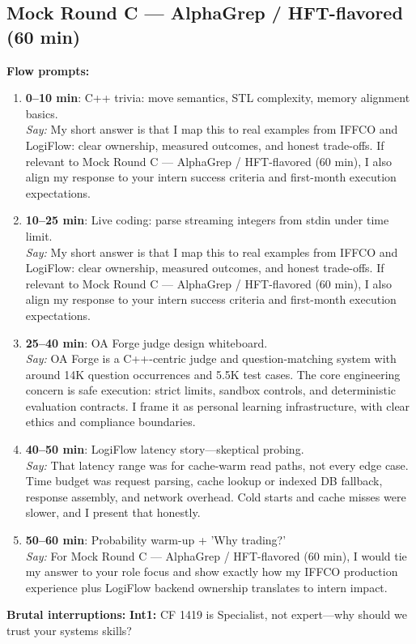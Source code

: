 \documentclass[9pt,a4paper]{article}
\begin{document}
\subsection{Mock Round C --- AlphaGrep / HFT-flavored (60 min)}
\textbf{Flow prompts:}
\begin{enumerate}
  \item \textbf{0--10 min}: C++ trivia: move semantics, STL complexity, memory alignment basics.\\
  \textit{Say:} My short answer is that I map this to real examples from IFFCO and LogiFlow: clear ownership, measured outcomes, and honest trade-offs. If relevant to Mock Round C --- AlphaGrep / HFT-flavored (60 min), I also align my response to your intern success criteria and first-month execution expectations.
  \item \textbf{10--25 min}: Live coding: parse streaming integers from stdin under time limit.\\
  \textit{Say:} My short answer is that I map this to real examples from IFFCO and LogiFlow: clear ownership, measured outcomes, and honest trade-offs. If relevant to Mock Round C --- AlphaGrep / HFT-flavored (60 min), I also align my response to your intern success criteria and first-month execution expectations.
  \item \textbf{25--40 min}: OA Forge judge design whiteboard.\\
  \textit{Say:} OA Forge is a C++-centric judge and question-matching system with around 14K question occurrences and 5.5K test cases. The core engineering concern is safe execution: strict limits, sandbox controls, and deterministic evaluation contracts. I frame it as personal learning infrastructure, with clear ethics and compliance boundaries.
  \item \textbf{40--50 min}: LogiFlow latency story---skeptical probing.\\
  \textit{Say:} That latency range was for cache-warm read paths, not every edge case. Time budget was request parsing, cache lookup or indexed DB fallback, response assembly, and network overhead. Cold starts and cache misses were slower, and I present that honestly.
  \item \textbf{50--60 min}: Probability warm-up + 'Why trading?'\\
  \textit{Say:} For Mock Round C --- AlphaGrep / HFT-flavored (60 min), I would tie my answer to your role focus and show exactly how my IFFCO production experience plus LogiFlow backend ownership translates to intern impact.
\end{enumerate}
\textbf{Brutal interruptions:}
\textbf{Int1:} CF 1419 is Specialist, not expert---why should we trust your systems skills?
\end{document}
